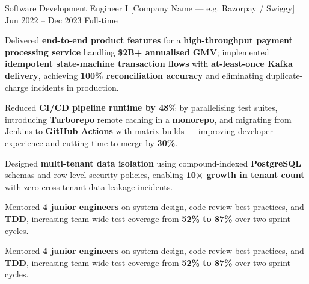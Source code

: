 \documentclass{bhaumic}
\begin{document}
\expentry
  {Software Development Engineer I}
  {[Company Name — e.g. Razorpay / Swiggy]}
  {Jun 2022 – Dec 2023}
  {Full-time}
  {
    \begin{resbullets}
      \item Delivered \textbf{end-to-end product features} for a \textbf{high-throughput
            payment processing service} handling \textbf{\$2B+ annualised GMV}; implemented
            \textbf{idempotent state-machine transaction flows} with \textbf{at-least-once
            Kafka delivery}, achieving \textbf{100\% reconciliation accuracy} and
            eliminating duplicate-charge incidents in production.

      \item Reduced \textbf{CI/CD pipeline runtime by 48\%} by parallelising test suites,
            introducing \textbf{Turborepo} remote caching in a \textbf{monorepo}, and
            migrating from Jenkins to \textbf{GitHub Actions} with matrix builds —
            improving developer experience and cutting time-to-merge by \textbf{30\%}.

      \item Designed \textbf{multi-tenant data isolation} using compound-indexed
            \textbf{PostgreSQL} schemas and row-level security policies,
            enabling \textbf{10× growth in tenant count} with zero cross-tenant
            data leakage incidents.

      \item Mentored \textbf{4 junior engineers} on system design, code review best
            practices, and \textbf{TDD}, increasing team-wide test coverage from
            \textbf{52\% to 87\%} over two sprint cycles.

      \item Mentored \textbf{4 junior engineers} on system design, code review best
            practices, and \textbf{TDD}, increasing team-wide test coverage from
            \textbf{52\% to 87\%} over two sprint cycles.
    \end{resbullets}
  }
\end{document}
